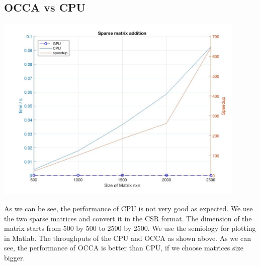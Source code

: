 \subsection{OCCA vs CPU}
\begin{center}
	\includegraphics[width = 12cm]{Chapters/sparse_matrix_addition.jpg}
\end{center}
As we can be see, the performance of CPU is not very good as expected. We use the two sparse matrices and convert it in the CSR format. The dimension of the matrix starts from 500 by 500 to  2500 by 2500. We use the semiology for plotting in Matlab. The throughputs of the CPU and OCCA as shown above. As we can see, the performance of OCCA is better than CPU, if we choose matrices size bigger.







